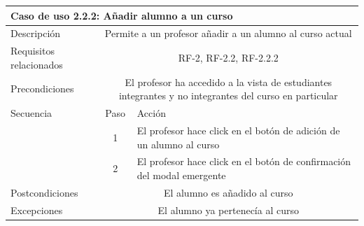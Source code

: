\hspace{3cm}

\begin{tabular}[H]{l c l}
\toprule 
\multicolumn{3}{l}{\textbf{Caso de uso 2.2.2: Añadir alumno a un curso}}\\
\midrule
Descripción & \multicolumn{2}{p{10cm}}{Permite a un profesor añadir a un alumno al curso actual}\\
\midrule
Requisitos relacionados & \multicolumn{2}{p{10cm}}{RF-2, RF-2.2, RF-2.2.2}\\
\midrule
Precondiciones & \multicolumn{2}{p{10cm}}{El profesor ha accedido a la vista de estudiantes integrantes y no integrantes del curso en particular}\\
\midrule
Secuencia & Paso & Acción \\
\cmidrule{2-3}
         & 1 &  \multicolumn{1}{p{8cm}}{El profesor hace click en el botón de adición de un alumno al curso}\\
         & 2 &  \multicolumn{1}{p{8cm}}{El profesor hace click en el botón de confirmación del modal emergente}\\
\midrule
Postcondiciones & \multicolumn{2}{p{10cm}}{El alumno es añadido al curso}\\
\midrule
Excepciones & \multicolumn{2}{p{10cm}}{El alumno ya pertenecía al curso}\\
\bottomrule 
\end{tabular}

\hspace{3cm}

